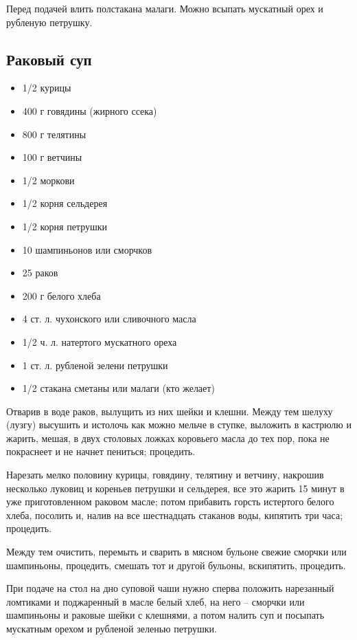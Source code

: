 Перед подачей влить полстакана малаги. Можно всыпать мускатный орех и рубленую петрушку.

\subsection{Раковый суп}\label{38rak-sup}

\begin{itemize}
	\item 1/2 курицы 
    \item 400 г говядины (жирного ссека) 
    \item 800 г телятины 
    \item 100 г ветчины 
    \item 1/2 моркови 
    \item 1/2 корня сельдерея
    \item 1/2 корня петрушки
    \item 10 шампиньонов или сморчков
    \item 25 раков 
    \item 200 г белого хлеба 
    \item 4 ст. л. чухонского или сливочного масла 
    \item 1/2 ч. л. натертого мускатного ореха 
    \item 1 ст. л. рубленой зелени петрушки 
    \item 1/2 стакана сметаны или малаги (кто желает)
\end{itemize}

Отварив в воде раков, вылущить из них шейки и клешни. Между тем шелуху (лузгу) высушить и истолочь как можно мельче в ступке, выложить в кастрюлю и жарить, мешая, в двух столовых ложках коровьего масла до тех пор, пока не покраснеет и не начнет пениться; процедить.

Нарезать мелко половину курицы, говядину, телятину и ветчину, накрошив несколько луковиц и кореньев петрушки и сельдерея, все это жарить 15 минут в уже приготовленном раковом масле; потом прибавить горсть истертого белого хлеба, посолить и, налив на все шестнадцать стаканов воды, кипятить три часа; процедить.

Между тем очистить, перемыть и сварить в мясном бульоне свежие сморчки или шампиньоны, процедить, смешать тот и другой бульоны, вскипятить, процедить.

При подаче на стол на дно суповой чаши нужно сперва положить нарезанный ломтиками и поджаренный в масле белый хлеб, на него – сморчки или шампиньоны и раковые шейки с клешнями, а потом налить суп и посыпать мускатным орехом и рубленой зеленью петрушки.

